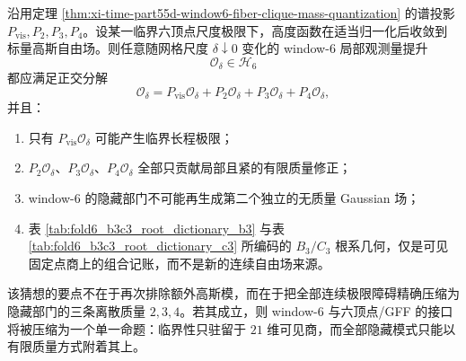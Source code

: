 \begin{conjecture}\label{conj:xi-time-part55d-window6-sixvertex-gff-visible-hidden-separation}
沿用定理 \ref{thm:xi-time-part55d-window6-fiber-clique-mass-quantization} 的谱投影 \(P_{\mathrm{vis}},P_2,P_3,P_4\)。设某一临界六顶点尺度极限下，高度函数在适当归一化后收敛到标量高斯自由场。则任意随网格尺度 \(\delta\downarrow 0\) 变化的 window-\(6\) 局部观测量提升
\[
\mathcal O_\delta\in \mathcal H_6
\]
都应满足正交分解
\[
\mathcal O_\delta
=
P_{\mathrm{vis}}\mathcal O_\delta
+
P_2\mathcal O_\delta
+
P_3\mathcal O_\delta
+
P_4\mathcal O_\delta,
\]
并且：
\begin{enumerate}
  \item 只有 \(P_{\mathrm{vis}}\mathcal O_\delta\) 可能产生临界长程极限；
  \item \(P_2\mathcal O_\delta\)、\(P_3\mathcal O_\delta\)、\(P_4\mathcal O_\delta\) 全部只贡献局部且紧的有限质量修正；
  \item window-\(6\) 的隐藏部门不可能再生成第二个独立的无质量 Gaussian 场；
  \item 表 \ref{tab:fold6_b3c3_root_dictionary_b3} 与表 \ref{tab:fold6_b3c3_root_dictionary_c3} 所编码的 \(B_3/C_3\) 根系几何，仅是可见固定点商上的组合记账，而不是新的连续自由场来源。
\end{enumerate}
\end{conjecture}

\begin{remark}
该猜想的要点不在于再次排除额外高斯模，而在于把全部连续极限障碍精确压缩为隐藏部门的三条离散质量 \(2,3,4\)。若其成立，则 window-\(6\) 与六顶点/GFF 的接口将被压缩为一个单一命题：临界性只驻留于 \(21\) 维可见商，而全部隐藏模式只能以有限质量方式附着其上。
\end{remark}

\endinput
